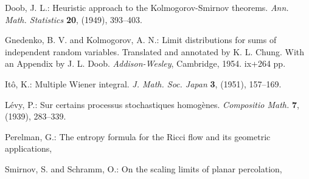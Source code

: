 \documentclass[ECP]{ejpecp} %
\begin{document}
\begin{thebibliography}{99}

 Doob, J. L.: Heuristic approach to the Kolmogorov-Smirnov
  theorems. \emph{Ann. Math. Statistics} \textbf{20}, (1949), 393--403.

 Gnedenko, B. V. and Kolmogorov, A. N.: Limit distributions for
  sums of independent random variables. Translated and annotated by K. L.
  Chung. With an Appendix by J. L. Doob. \emph{Addison-Wesley}, Cambridge,
  1954. ix+264 pp. 

 It\^o, K.: Multiple Wiener integral. \emph{J. Math. Soc. Japan}
  \textbf{3}, (1951), 157--169. 

 L\'evy, P.: Sur certains processus stochastiques homog\`enes.
  \emph{Compositio Math.} \textbf{7}, (1939), 283--339. 

 Perelman, G.: The entropy formula for the Ricci flow and its
  geometric applications, 

 Smirnov, S. and Schramm, O.: On the scaling limits of planar
  percolation, 

\end{thebibliography}




\end{document}
